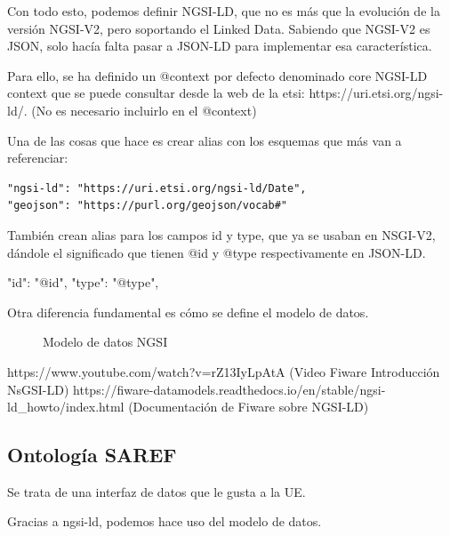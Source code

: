 \documentclass[12pt, a4paper, twoside]{article}
\begin{document}
Con todo esto, podemos definir NGSI-LD, que no es más que la evolución de la versión
NGSI-V2, pero soportando el Linked Data. Sabiendo que NGSI-V2 es JSON, solo hacía
falta pasar a JSON-LD para implementar esa característica.

Para ello, se ha definido un @context por defecto denominado core NGSI-LD context
que se puede consultar desde la web de la etsi: https://uri.etsi.org/ngsi-ld/.
(No es necesario incluirlo en el @context)

Una de las cosas que hace es crear alias con los esquemas que más van a referenciar:
\begin{lstlisting}
"ngsi-ld": "https://uri.etsi.org/ngsi-ld/Date",
"geojson": "https://purl.org/geojson/vocab#"
\end{lstlisting}

También crean alias para los campos id y type, que ya se usaban en NSGI-V2,
dándole el significado que tienen @id y @type respectivamente en JSON-LD.

"id": "@id",
"type": "@type",

Otra diferencia fundamental es cómo se define el modelo de datos.
\begin{figure}[h]
  \centering
  \caption{Modelo de datos NGSI}
\end{figure}

https://www.youtube.com/watch?v=rZ13IyLpAtA (Video Fiware Introducción NsGSI-LD)
https://fiware-datamodels.readthedocs.io/en/stable/ngsi-ld\_howto/index.html 
 (Documentación de Fiware sobre NGSI-LD)

\subsection{Ontología SAREF}
Se trata de una interfaz de datos que le gusta a la UE.

Gracias a ngsi-ld, podemos hace uso del modelo de datos.
\end{document}
